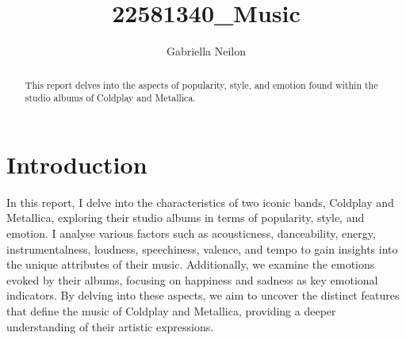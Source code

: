 \documentclass[11pt,preprint, authoryear]{elsarticle}
\numberwithin{equation}{section}
\numberwithin{figure}{section}
\numberwithin{table}{section}
\begin{document}
\begin{frontmatter}  %

\title{22581340\_Music}





\author[Add1]{Gabriella Neilon}





\address[Add1]{Stellenbosch University}


\begin{abstract}
\small{
This report delves into the aspects of popularity, style, and emotion
found within the studio albums of Coldplay and Metallica.
}
\end{abstract}

\vspace{1cm}





\vspace{0.5cm}

\end{frontmatter}

\setcounter{footnote}{0}



\pagestyle{fancy}
\chead{}
\rhead{}
\lfoot{}
\lhead{}
\cfoot{}


\headsep 35pt %




\hypertarget{introduction}{%
\section{\texorpdfstring{Introduction
\label{Introduction}}{Introduction }}\label{introduction}}

In this report, I delve into the characteristics of two iconic bands,
Coldplay and Metallica, exploring their studio albums in terms of
popularity, style, and emotion. I analyse various factors such as
acousticness, danceability, energy, instrumentalness, loudness,
speechiness, valence, and tempo to gain insights into the unique
attributes of their music. Additionally, we examine the emotions evoked
by their albums, focusing on happiness and sadness as key emotional
indicators. By delving into these aspects, we aim to uncover the
distinct features that define the music of Coldplay and Metallica,
providing a deeper understanding of their artistic expressions.
\end{document}
